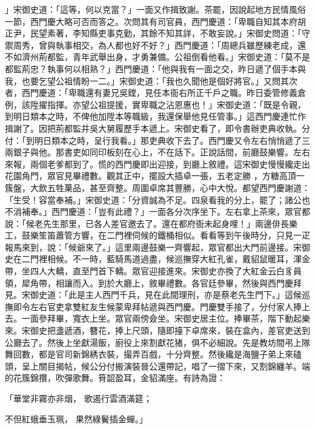 」宋御史道：「這等，何以克當？」一面又作揖致謝。茶罷，因說起地方民情風俗一節，西門慶大略可否而答之。次問其有司官員，西門慶道：「卑職自知其本府胡正尹，民望素著，李知縣吏事克勤，其餘不知其詳，不敢妄說。」宋御史問道：「守禦周秀，曾與執事相交，為人都也好不好？」西門慶道：「周總兵雖歷練老成，還不如濟州荊都監，青年武舉出身，才勇兼備。公祖倒看他看。」宋御史道：「莫不是都監荊忠？執事何以相熟？」西門慶道：「他與我有一面之交，昨日遞了個手本與我，也要乞望公祖情盼一二。」宋御史道：「我也久聞他是個好將官。」又問其次者，西門慶道：「卑職還有妻兄吳鏜，見任本衙右所正千戶之職。昨日委管修義倉例，該陞擢指揮。亦望公祖提援，實卑職之沾恩惠也！」宋御史道：「既是令親，到明日類本之時，不俾他加陞本等職級，我還保舉他見任管事。」這西門慶連忙作揖謝了。因把荊都監并吳大舅履歷手本遞上。宋御史看了，即令書辦吏典收執。分付：「到明日類本之時，呈行我看。」那吏典收下去了。西門慶又令左右悄悄遞了三兩銀子與他。那書吏如同印板刻在心上，不在話下。正說話間，前廳鼓樂響。左右來報，兩個老爹都到了。慌的西門慶即出迎接，到廳上敘禮。這宋御史慢慢纔走出花園角門，眾官見畢禮數。觀其正中，擺設大插卓一張，五老定勝 ，方糖高頂一簇盤，大飲五牲菓品，甚至齊整。周圍卓席其豐勝，心中大悅。都望西門慶謝道：「生受！容當奉補。」宋御史道：「分資誠為不足。四泉看我的分上，罷了；諸公也不消補奉。」西門慶道：「豈有此禮？」一面各分次序坐下。左右拿上茶來，眾官都說：「候老先生那里，已各人差官邀去了。還在都府衙未起身哩！」兩邊俳長樂工，鼓樂笙笛蕭管方響，在二門裡伺候的鐵桶相似。看看等到午後時分，只見一疋報馬來到，說：「候爺來了。」這里兩邊鼓樂一齊響起，眾官都出大門前邊接。宋御史在二門裡相候。不一時，藍騎馬道過盡，候巡撫穿大紅孔雀，戴貂鼠暖耳，渾金帶，坐四人大轎，直至門首下轎。眾官迎接進來。宋御史亦換了大紅金云白豸員領，犀角帶，相讓而入。到於大廳上，敘畢禮數。各官廷參畢，然後與西門慶拜見。宋御史道：「此是主人西門千兵，見在此間理刑，亦是蔡老先生門下。」這候巡撫即令左右官吏拿雙紅友生候蒙卑拜帖遞與西門慶。門慶雙手接了，分付家人捧上去。一面參拜畢，寬衣上坐。眾官兩傍僉坐。宋御史居主位。捧畢茶，階下動起樂來。宋御史把盞遞酒，簪花，捧上尺頭，隨即擡下卓席來，裝在盒內，差官吏送到公廳去了。然後上坐獻湯飯，廚役上來割獻花猪，俱不必細說。先是教坊間弔上隊舞回數，都是官司新錦綉衣裝，撮弄百戲，十分齊整。然後纔是海鹽子弟上來磕頭，呈上關目揭帖，候公分付搬演裝晉公還帶記，唱了一摺下來，又割錦纏羊。端的花簇錦攢，吹彈歌舞。筲韶盈耳，金貂滿座。有詩為證：

「華堂非霧亦非烟，  歌遏行雲酒滿筵；

不但紅蛾垂玉珮，  果然綠鬢插金蟬。」

